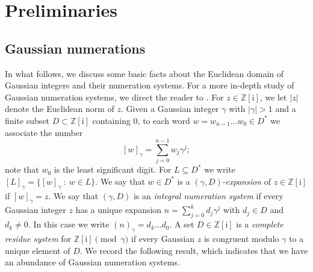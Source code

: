 \documentclass{amsart}
\newcommand{\Z}{\mathbb{Z}}
\newcommand{\ii}{\mathrm{i}}
\newtheorem*{main theorem}{Theorem \ref{thm:main-gaussian}}
\theoremstyle{definition}
\begin{document}
\section{Preliminaries}\label{sec:preliminaries}

 
 
 
\subsection{Gaussian numerations} In what follows, we discuss some basic facts about the Euclidean domain of Gaussian integers and their numeration systems. For a more in-depth study of Gaussian numeration systems, we direct the reader to \cite[Chapter 7]{Lothaire}.
For $z\in \mathbb Z[\ii]$, we let $|z|$ denote the Euclidean norm of $z$. 
    Given a Gaussian integer $\gamma$ with  $\lvert\gamma\rvert>1$ and a finite subset $D\subset\Z[\ii]$ containing $0$, to each word $w=w_{n-1}\dotsc w_0\in D^*$ we associate the number
        \[[w]_\gamma = \sum_{j=0}^{n-1} w_j\gamma^j; \]
        note that $w_0$ is the least significant digit.
   For $L\subseteq D^*$ we write $[L]_\gamma = \{[w]_\gamma\::\:w\in L \}$. We say that $w\in D^*$ is a $(\gamma,D)$-\emph{expansion} of  $z\in\Z[\ii]$ if $[w]_\gamma=z$.  We say that $(\gamma,D)$ is an {\em integral numeration system} 
 if every Gaussian integer $z$ has a unique  expansion  $n=  \sum_{j=0}^{k} d_j\gamma^j$ with $d_j\in D$ and $d_{k }\neq 0$. In this case we write 
  $(n)_\gamma = d_k \dots d_0$. A set $D\in \Z[\ii]$ is a {\em complete residue system} for $\Z[\ii] \pmod \gamma$
 if every Gaussian $z$ is congruent modulo $\gamma$ to a unique
element of $D$. 
We record the following result, which indicates that we have an abundance of Gaussian numeration systems.
\end{document}
